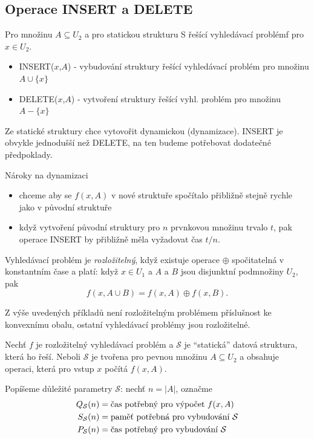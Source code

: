 \subsection{Operace INSERT a DELETE}

Pro množinu $A \subseteq U_2$ a pro statickou strukturu {\cal S}
řešící vyhledávací problémf pro $x \in U_2$.
\par
\begin{itemize}
\item INSERT($x$,$A$) - vybudování struktury řešící vyhledávací problém pro množinu
$A \cup \{x\}$
\item DELETE($x$,$A$) - vytvoření struktury řešící vyhl. problém pro množinu 
$A - \{x\}$
\end{itemize}

\begin{pozn}
Ze statické struktury chce vytovořit dynamickou (dynamizace). INSERT je
obvykle jednodušší než DELETE, na ten budeme potřebovat dodatečné
předpoklady.
\end{pozn}

Nároky na dynamizaci
\begin{itemize}
\item chceme aby se $f(x,A)$ v nové struktuře spočítalo přibližně 
  stejně rychle jako v původní struktuře
\item když vytvoření původní struktury pro $n$ prvnkovou množinu trvalo
  $t$, pak operace INSERT by přibližně měla vyžadovat čas $t/n$.
\end{itemize}

\begin{defn}
Vyhledávací problém je \emph{rozložitelný}, když
existuje operace $\oplus$ spočitatelná v konstantním čase a platí:
když $x \in U_1$ a $A$ a $B$ jsou disjunktní podmnožiny $U_2$, pak
\[
	f(x, A \cup B) = f(x, A) \oplus f(x, B).
\]
\end{defn}

\begin{pozn}
Z výše uvedených příkladů není rozložitelným problémem příslušnost ke
konvexnímu obalu, ostatní vyhledávací problémy jsou rozložitelné.
\end{pozn}

\newcommand{\staticka }{\ensuremath{\mathcal{S}}}
\newcommand{\dynamicka}{\ensuremath{\mathcal{D}}}


\begin{defn}
Nechť $f$ je rozložitelný vyhledávací problém a $\staticka$ je
``statická'' datová struktura, která ho řeší. Neboli $\staticka$ je
tvořena pro pevnou množinu $A \subseteq U_2$ a obsahuje operaci, která
pro vstup $x$ počítá $f(x, A)$.

Popíšeme důležité parametry $\staticka$: nechť $n = |A|$, označme
\begin{align*}
Q_\staticka(n) & = \text{čas potřebný pro výpočet $f(x,A)$}\\
S_\staticka(n) & = \text{paměť potřebná pro vybudování \staticka}\\
P_\staticka(n) & = \text{čas potřebný pro vybudování \staticka}
\end{align*}
\end{defn}

